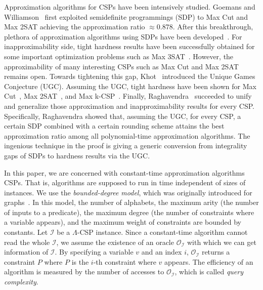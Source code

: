 \documentclass[letterpaper, 11pt]{article}
\newcommand{\calI}{\mathcal{I}}
\newcommand{\calO}{\mathcal{O}}
\begin{document}
Approximation algorithms for CSPs have been intensively studied.
Goemans and Williamson~\cite{GW95} first exploited semidefinite programmings (SDP) to \textsf{Max Cut} and \textsf{Max 2SAT} achieving the approximation ratio $\approx 0.878$.
After this breakthrough,
plethora of approximation algorithms using SDPs have been developed~\cite{KMS98,LLZ02}.
For inapproximability side,
tight hardness results have been successfully obtained for some important optimization problems such as \textsf{Max 3SAT}~\cite{Has01}.
However,
the approximability of many interesting CSPs such as \textsf{Max Cut} and \textsf{Max 2SAT} remains open.
Towards tightening this gap,
Khot~\cite{Kho02} introduced the Unique Games Conjecture (UGC).
Assuming the UGC,
tight hardness have been shown for \textsf{Max Cut}~\cite{KKMO04}, \textsf{Max 2SAT}~\cite{Aus07},
and \textsf{Max k-CSP}~\cite{AM08,ST06}.
Finally, 
Raghavendra~\cite{Rag08} succeeded to unify and generalize those approximation and inapproximability results for every CSP.
Specifically, Raghavendra showed that,
assuming the UGC,
for every CSP, 
a certain SDP combined with a certain rounding scheme attains the best approximation ratio among all polynomial-time approximation algorithms.
The ingenious technique in the proof is giving a generic conversion from integrality gaps of SDPs to hardness results via the UGC.

In this paper,
we are concerned with constant-time approximation algorithms CSPs.
That is, algorithms are supposed to run in time independent of sizes of instances.
We use the \textit{bounded-degree model},
which was originally introduced for graphs~\cite{GR08}.
In this model,
the number of alphabets, 
the maximum arity (the number of inputs to a predicate),
the maximum degree (the number of constraints where a variable appears),
and the maximum weight of constraints are bounded by constants.
Let $\calI$ be a $\Lambda$-CSP instance.
Since a constant-time algorithm cannot read the whole $\calI$,
we assume the existence of an oracle $\calO_{\calI}$ with which we can get information of $\calI$.
By specifying a variable $v$ and an index $i$, $\calO_{\calI}$ returns a constraint $P$ where $P$ is the $i$-th constraint where $v$ appears.
The efficiency of an algorithm is measured by the number of accesses to $\calO_{\calI}$, which is called \textit{query complexity}.
\end{document}
